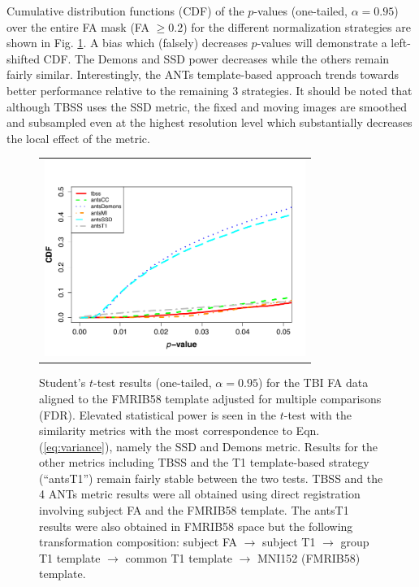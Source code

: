 \documentclass[final,5p,times,twocolumn]{elsarticle}
\begin{document}
Cumulative distribution functions (CDF) of the $p$-values (one-tailed, $\alpha = 0.95$)
over the entire FA mask (FA $\geq 0.2$) for the different normalization
strategies are shown in Fig. \ref{fig:tbi_testing}.
A bias which (falsely) decreases $p$-values will demonstrate a left-shifted
CDF. 
  The Demons and SSD power decreases while the others
remain fairly similar.  Interestingly, the ANTs template-based approach
trends towards better performance relative to the remaining 3 strategies.
It should be noted that although TBSS uses the SSD metric, the fixed and moving images are smoothed and subsampled even at the highest resolution level which substantially decreases the local effect of the metric.





\begin{figure}
\begin{center}
\begin{tabular}{c}
  \includegraphics[width=85mm]{tbittest.pdf}
\end{tabular}
\caption{Student's $t$-test results (one-tailed, $\alpha = 0.95$) for the TBI FA data aligned to the FMRIB58 template adjusted for multiple comparisons (FDR).  Elevated statistical power is seen in the $t$-test with the similarity metrics with the most correspondence to Eqn. (\ref{eq:variance}), namely the SSD and Demons metric.  Results for the other metrics including TBSS and the T1 template-based strategy (``antsT1'') remain fairly stable between the two tests.    TBSS and the 4 ANTs metric
results were all obtained using direct registration involving subject FA and the FMRIB58 template.  The antsT1 results were also obtained in FMRIB58 space but the following transformation composition: subject FA $\rightarrow$ subject T1 $\rightarrow$ group T1 template $\rightarrow$ 
common T1 template $\rightarrow$ MNI152 (FMRIB58) template.  
}
\label{fig:tbi_testing}
\end{center}        
\end{figure}
\end{document}
